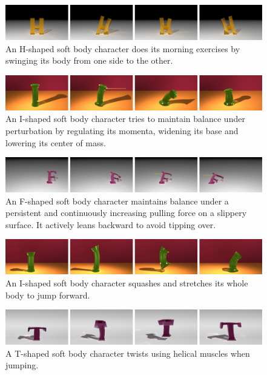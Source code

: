 \begin{figure}[ht]
\centering
\includegraphics[width=\textwidth]{figures/HSwing.eps}
\caption{An H-shaped soft body character does its morning exercises by swinging its body from one side to the other.}
\label{fig:HSwing}
\end{figure}

\begin{figure}[ht]
\centering
\includegraphics[width=\textwidth]{figures/IBalance.eps}
\caption{An I-shaped soft body character tries to maintain balance under
perturbation by regulating its momenta, widening its base and lowering its center of mass.}
\label{fig:IBalance}
\end{figure}

\begin{figure}[ht]
\centering
\includegraphics[width=\textwidth]{figures/FBalance.eps}
\caption{An F-shaped soft body character maintains balance under a persistent and continuously increasing pulling force on a slippery surface. It actively leans backward to avoid tipping over.}
\label{fig:FBalance}
\end{figure}

\begin{figure}[ht]
\centering
\includegraphics[width=\textwidth]{figures/IJump.eps}
\caption{An I-shaped soft body character squashes and stretches its whole body to jump forward.}
\label{fig:IJump}
\end{figure}

\begin{figure}[ht]
\centering
\includegraphics[width=\textwidth]{figures/TTwist.eps}
\caption{A T-shaped soft body character twists using helical muscles when jumping.}
\label{fig:TJump}
\end{figure}

